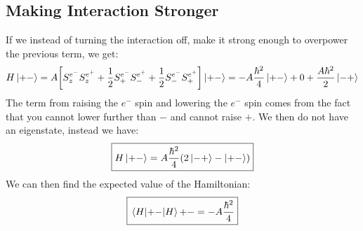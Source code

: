 \documentclass[12pt]{article}
\begin{document}
\subsection{Making Interaction Stronger}
If we instead of turning the interaction off, make it strong enough to overpower the previous term, we get:
\begin{align*}
  H\ket{+-}=A
  \qty[S_z^{e^-}S_z^{e^+}+\frac12S_+^{e^-}S_-^{e^+}+\frac12S^{e^-}_-S^{e^+}_+]
  \ket{+-}=
  -A\frac{\hbar^2}4\ket{+-}+0+\frac{A\hbar^2}2\ket{-+}
\end{align*}
The term from raising the $e^{-}$ spin and lowering the $e^{-}$ spin comes from the fact that you cannot lower further than $-$ and cannot raise $+$. We then do not have an eigenstate, instead we have:
\begin{align}
  \boxed{H\ket{+-}=A\frac{\hbar^2}4\qty(2\ket{-+}-\ket{+-})}
\end{align}
We can then find the expected value of the Hamiltonian:
\begin{align}
  \boxed{\ev{+-}{H}{+-}=-A\frac{\hbar^2}{4}}
\end{align}
\end{document}
